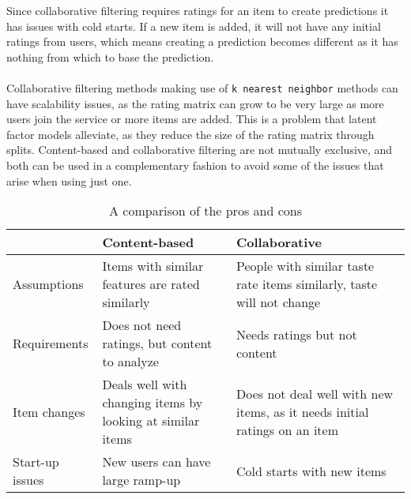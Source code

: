 Since collaborative filtering requires ratings for an item to create predictions it has issues with cold starts.
If a new item is added, it will not have any initial ratings from users, which means creating a prediction becomes different as it has nothing from which to base the prediction.
\\\\
Collaborative filtering methods making use of \texttt{k nearest neighbor} methods can have scalability issues, as the rating matrix can grow to be very large as more users join the service or more items are added.
This is a problem that latent factor models alleviate, as they reduce the size of the rating matrix through splits.
Content-based and collaborative filtering are not mutually exclusive, and both can be used in a complementary fashion to avoid some of the issues that arise when using just one.
\begin{table}[]
    \begin{tabular}{|p{}|p{}|p{}|}
    \hline
                    & Content-based                                              & Collaborative                                                             \\ \hline
    Assumptions     & Items with similar features are rated similarly            & People with similar taste rate items similarly, taste will not change     \\ \hline
    Requirements    & Does not need ratings, but content to analyze              & Needs ratings but not content                                             \\ \hline
    Item changes    & Deals well with changing items by looking at similar items & Does not deal well with new items, as it needs initial ratings on an item \\ \hline
    Start-up issues & New users can have large ramp-up                           & Cold starts with new items                                                \\ \hline
    \end{tabular}
    \caption{A comparison of the pros and cons}
    \label{tab:recprosandcons}
    \end{table}

